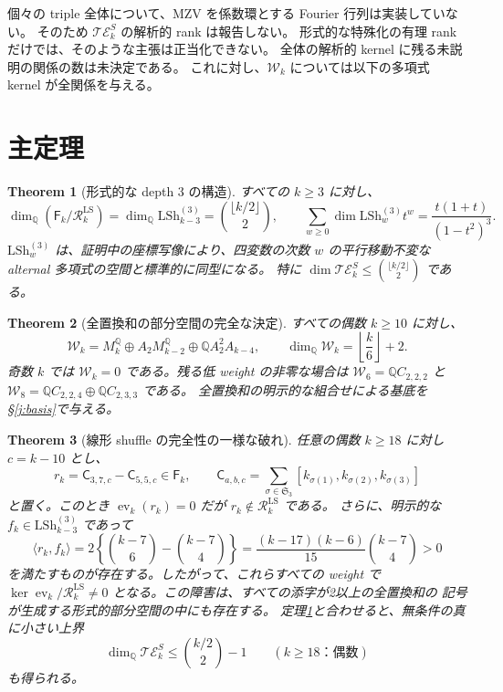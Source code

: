 \documentclass[12pt]{amsart}
\newtheorem{thm}{Theorem}[section]
\theoremstyle{definition}
\theoremstyle{remark}
\numberwithin{equation}{section}
\newcommand{\Q}{\mathbb{Q}}
\newcommand{\LS}{\mathrm{LSh}}
\newcommand{\ev}{\operatorname{ev}}
\newcommand{\RR}{\mathcal R^{\mathrm{LS}}}
\newcommand{\WW}{\mathcal W}
\newcommand{\FF}{\mathsf F}
\newcommand{\fC}[3]{\mathsf C_{#1,#2,#3}}
\numberwithin{equation}{section}
\begin{document}
個々の triple 全体について、MZV を係数環とする Fourier 行列は実装していない。
そのため $\mathcal{TE}_k^S$ の解析的 rank は報告しない。
形式的な特殊化の有理 rank だけでは、そのような主張は正当化できない。
全体の解析的 kernel に残る未説明の関係の数は未決定である。
これに対し、$\WW_k$ については以下の多項式 kernel が全関係を与える。

\section{主定理}
\begin{thm}[形式的な depth 3 の構造]\label{j:formal}
すべての $k\ge3$ に対し、
\[
 \dim_{\Q}(\FF_k/\RR_k)=\dim_{\Q}\LS_{k-3}^{(3)}
      =\binom{\lfloor k/2\rfloor}{2},\qquad
 \sum_{w\ge0}\dim\LS_w^{(3)}t^w=\frac{t(1+t)}{(1-t^2)^3}.
\]
$\LS_w^{(3)}$ は、証明中の座標写像により、四変数の次数 $w$ の平行移動不変な
alternal 多項式の空間と標準的に同型になる。
特に $\dim\mathcal{TE}_k^S\le\binom{\lfloor k/2\rfloor}{2}$ である。
\end{thm}

\begin{thm}[全置換和の部分空間の完全な決定]\label{j:orbit}
すべての偶数 $k\ge10$ に対し、
\begin{equation}\label{j:decomp}
 \WW_k=M_k^{\Q}\oplus A_2M_{k-2}^{\Q}\oplus\Q A_2^2A_{k-4},
 \qquad \dim_{\Q}\WW_k=\left\lfloor\frac{k}{6}\right\rfloor+2.
\end{equation}
奇数 $k$ では $\WW_k=0$ である。残る低 weight の非零な場合は
$\WW_6=\Q C_{2,2,2}$ と
$\WW_8=\Q C_{2,2,4}\oplus\Q C_{2,3,3}$ である。
全置換和の明示的な組合せによる基底を\S\ref{j:basis}で与える。
\end{thm}

\begin{thm}[線形 shuffle の完全性の一様な破れ]\label{j:negative}
任意の偶数 $k\ge18$ に対し $c=k-10$ とし、
\[
 r_k=\fC{3}{7}{c}-\fC{5}{5}{c}\in\FF_k,\qquad
 \fC{a}{b}{c}=\sum_{\sigma\in\mathfrak S_3}
 [k_{\sigma(1)},k_{\sigma(2)},k_{\sigma(3)}]
\]
と置く。このとき $\ev_k(r_k)=0$ だが $r_k\notin\RR_k$ である。
さらに、明示的な $f_k\in\LS_{k-3}^{(3)}$ であって
\begin{equation}\label{j:certificate}
 \langle r_k,f_k\rangle
 =2\left\{\binom{k-7}{6}-\binom{k-7}{4}\right\}
 =\frac{(k-17)(k-6)}{15}\binom{k-7}{4}>0
\end{equation}
を満たすものが存在する。したがって、これらすべての weight で
$\ker\ev_k/\RR_k\ne0$ となる。この障害は、すべての添字が2以上の全置換和の
記号が生成する形式的部分空間の中にも存在する。
定理\ref{j:formal}と合わせると、無条件の真に小さい上界
\[
 \dim_{\Q}\mathcal{TE}_k^S\le\binom{k/2}{2}-1\qquad(k\ge18\text{：偶数})
\]
も得られる。
\end{thm}
\end{document}
